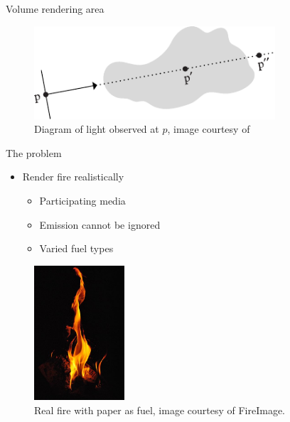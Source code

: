 \documentclass{beamer}
\begin{document}
\begin{frame}{Volume rendering area}

\begin{figure}[b!]
\includegraphics[width=0.8\textwidth]{img/ray_marching}
\caption*{\tiny{Diagram of light observed at $p$, image courtesy of~\cite{Pharr:2004}}}
\end{figure}

\end{frame}

\begin{frame}{The problem}

\begin{multicols}{2}

\begin{itemize}
\setlength\itemsep{0.5em}
\item Render fire realistically 
		\begin{itemize}
		\setlength\itemsep{0.5em}
		\item Participating media 
		\item Emission cannot be ignored
		\item Varied fuel types
		\end{itemize}
\end{itemize}

\begin{figure}[t!]
\begin{center}
\includegraphics[width=0.3\textwidth]{img/real_fire1} 
\caption*{\tiny{Real fire with paper as fuel, image courtesy of FireImage\footnotemark[2].}}
\end{center}
\end{figure}
\end{multicols}

\end{frame}
\end{document}
